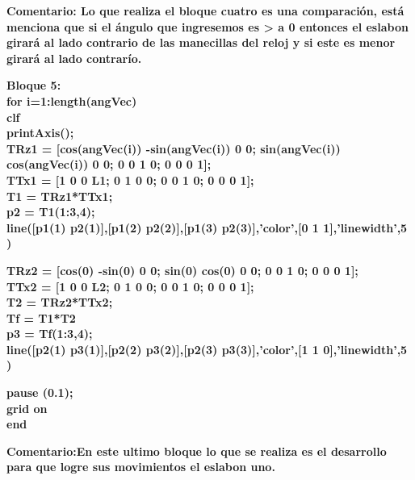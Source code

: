 \documentclass[10pt,a4paper]{article}
\begin{document}
\begin{flushleft}
\textbf{Comentario: Lo que realiza el bloque cuatro es una comparación, está menciona que si el ángulo que ingresemos es > a 0 entonces el eslabon girará al lado contrario de las manecillas del reloj y si este es menor girará al lado contrarío.}
\end{flushleft}
\begin{flushleft}
\textbf{Bloque 5:\\
for i=1:length(angVec)\\
    clf\\
    printAxis();\\
    TRz1 = [cos(angVec(i)) -sin(angVec(i)) 0 0; sin(angVec(i)) cos(angVec(i)) 0 0; 0 0 1 0; 0 0 0 1];\\
    TTx1 = [1 0 0 L1; 0 1 0 0; 0 0 1 0; 0 0 0 1];\\
    T1 = TRz1*TTx1;\\
    p2 = T1(1:3,4);\\
    line([p1(1) p2(1)],[p1(2) p2(2)],[p1(3) p2(3)],'color',[0 1 1],'linewidth',5 )
  }
\end{flushleft}
\begin{flushleft}
\textbf{TRz2 = [cos(0) -sin(0) 0 0; sin(0) cos(0) 0 0; 0 0 1 0; 0 0 0 1];\\
    TTx2 = [1 0 0 L2; 0 1 0 0; 0 0 1 0; 0 0 0 1];\\
    T2 = TRz2*TTx2;\\
    Tf = T1*T2\\
    p3 = Tf(1:3,4);\\
    line([p2(1) p3(1)],[p2(2) p3(2)],[p2(3) p3(3)],'color',[1 1 0],'linewidth',5 )
}
\end{flushleft}
\begin{flushleft}
\textbf{pause (0.1);\\ grid on\\
end}
\end{flushleft}
\begin{flushleft}
\textbf{Comentario:En este ultimo bloque lo que se realiza es el desarrollo para que logre sus movimientos el eslabon uno.}
\end{flushleft}
\end{document}
